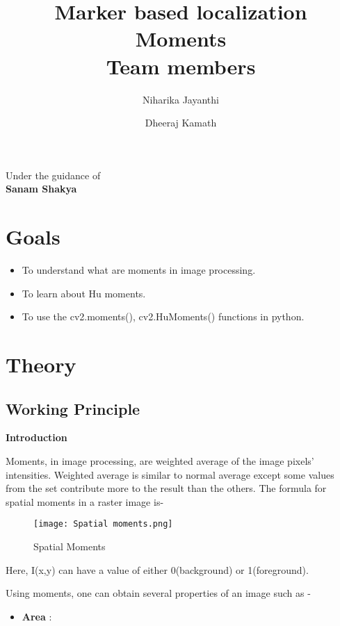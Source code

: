 \documentclass[]{article}
\date{}
\title {Marker based localization \\ [10pt]
	Moments  \\[25pt] Team members }
\author {Niharika Jayanthi \and Dheeraj Kamath}
\providecommand{\tightlist}{%
  \setlength{\itemsep}{0pt}\setlength{\parskip}{0pt}}
\begin{document}
\maketitle
\begin{center}
	\begin{large}
		Under the guidance of\\
		\textbf{Sanam Shakya}\\
		\vspace{0.5in}
	\end{large}
\end{center}
\section{Goals}\label{goals}

\begin{itemize}
\tightlist
\item
  To understand what are moments in image processing.
\item
  To learn about Hu moments.
\item
  To use the cv2.moments(), cv2.HuMoments() functions in python.
\end{itemize}

\section{Theory}\label{theory}

\subsection{Working Principle}\label{working-principle}

\textbf{Introduction}

Moments, in image processing, are weighted average of the image pixels'
intensities. Weighted average is similar to normal average except some
values from the set contribute more to the result than the others. The
formula for spatial moments in a raster image is-

\begin{figure}[htbp]
\centering
\texttt{[image: Spatial moments.png]}
\caption{Spatial Moments}
\end{figure}

Here, I(x,y) can have a value of either 0(background) or 1(foreground).

Using moments, one can obtain several properties of an image such as -

\begin{itemize}
\tightlist
\item
  \textbf{Area} :
\end{itemize}
\end{document}
